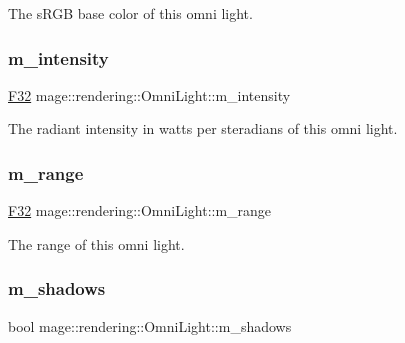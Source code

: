 The s\+R\+GB base color of this omni light. \hypertarget{classmage_1_1rendering_1_1_omni_light_af7ba6e05e5809d16ec070a2b2de47a62}{}\label{classmage_1_1rendering_1_1_omni_light_af7ba6e05e5809d16ec070a2b2de47a62} 
\subsubsection{\texorpdfstring{m\+\_\+intensity}{m\_intensity}}
{\footnotesize\ttfamily \hyperlink{namespacemage_aa97e833b45f06d60a0a9c4fc22ae02c0}{F32} mage\+::rendering\+::\+Omni\+Light\+::m\+\_\+intensity\hspace{0.3cm}{\ttfamily [private]}}

The radiant intensity in watts per steradians of this omni light. \hypertarget{classmage_1_1rendering_1_1_omni_light_a4737ecec7dd824c75073d849b604fe1d}{}\label{classmage_1_1rendering_1_1_omni_light_a4737ecec7dd824c75073d849b604fe1d} 
\subsubsection{\texorpdfstring{m\+\_\+range}{m\_range}}
{\footnotesize\ttfamily \hyperlink{namespacemage_aa97e833b45f06d60a0a9c4fc22ae02c0}{F32} mage\+::rendering\+::\+Omni\+Light\+::m\+\_\+range\hspace{0.3cm}{\ttfamily [private]}}

The range of this omni light. \hypertarget{classmage_1_1rendering_1_1_omni_light_af0cb508d0333f86cf64c28f5628177d4}{}\label{classmage_1_1rendering_1_1_omni_light_af0cb508d0333f86cf64c28f5628177d4} 
\subsubsection{\texorpdfstring{m\+\_\+shadows}{m\_shadows}}
{\footnotesize\ttfamily bool mage\+::rendering\+::\+Omni\+Light\+::m\+\_\+shadows\hspace{0.3cm}{\ttfamily [private]}}

